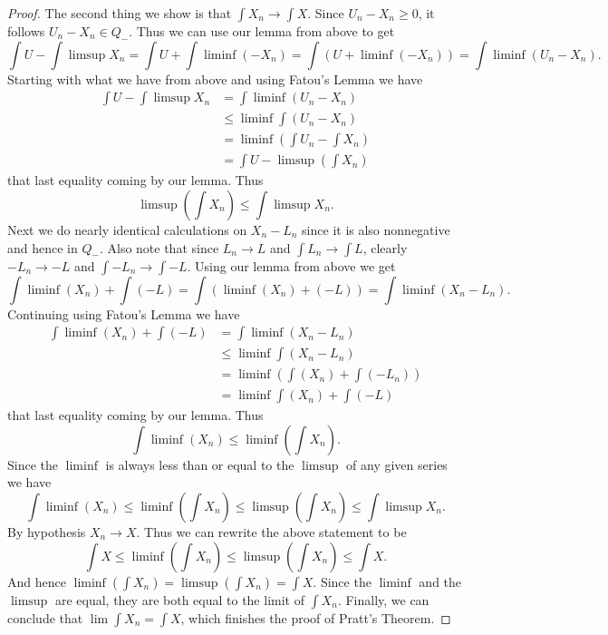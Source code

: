 \documentclass[letterpaper,10pt]{article}
\begin{document}
\begin{enumerate}
\begin{proof}
The second thing we show is that $\int X_n \rightarrow \int X$. Since $U_n - X_n \geq 0$, it follows $U_n - X_n \in Q_-$. Thus we can use our lemma from above to get
\[
\int U - \int \limsup X_n = \int U + \int \liminf (- X_n) = \int ( U + \liminf (- X_n) )
= \int \liminf (U_n - X_n)\text{.}
\]
Starting with what we have from above and using Fatou's Lemma we have
\begin{align*}
\int U - \int \limsup X_n &= \int \liminf (U_n - X_n) \\
&\leq \liminf \int (U_n - X_n) \\
&= \liminf (\int U_n - \int X_n) \\
&= \int U - \limsup (\int X_n)
\end{align*}
that last equality coming by our lemma. Thus 
\[
\limsup (\int X_n) \leq \int \limsup X_n \text{.}
\]
Next we do nearly identical calculations on $X_n - L_n$ since it is also nonnegative and hence in $Q_-$. Also note that since $L_n \rightarrow L$ and $\int L_n \rightarrow \int L$, clearly $-L_n \rightarrow -L $ and $\int -L_n \rightarrow \int -L$.
Using our lemma from above we get
\[
\int \liminf (X_n) + \int (-L) = \int (\liminf(X_n) + (- L))
= \int \liminf (X_n - L_n)\text{.}
\]
Continuing using Fatou's Lemma we have 
\begin{align*}
\int \liminf (X_n) + \int (-L) &= \int \liminf (X_n - L_n) \\
& \leq \liminf \int (X_n - L_n) \\
&= \liminf ( \int (X_n) + \int (-L_n) ) \\
&= \liminf \int (X_n) + \int (-L)
\end{align*}
that last equality coming by our lemma. Thus
\[
\int \liminf (X_n) \leq \liminf (\int X_n) \text{.}
\]
Since the $\liminf$ is always less than or equal to the $\limsup$ of any given series we have
\[
\int \liminf (X_n) \leq \liminf (\int X_n) \leq \limsup (\int X_n) \leq \int \limsup X_n \text{.}
\]
By hypothesis $X_n \rightarrow X$. Thus we can rewrite the above statement to be
\[
\int X \leq \liminf (\int X_n) \leq \limsup (\int X_n) \leq \int X \text{.}
\]
And hence $\liminf (\int X_n) = \limsup (\int X_n) = \int X$. Since the $\liminf$ and the $\limsup$ are equal, they are both equal to the limit of $\int X_n$. Finally, we can conclude that $\lim \int X_n = \int X$, which finishes the proof of Pratt's Theorem. 
\end{proof}



\end{enumerate}
\end{document}
